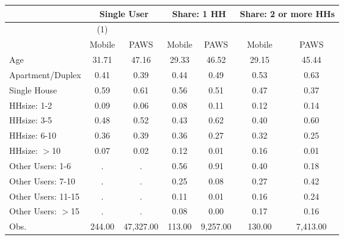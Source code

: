 \begin{tabular}{lcccccc}
&\multicolumn{2}{c}{Single User} & \multicolumn{2}{c}{Share: 1 HH} & \multicolumn{2}{c}{Share: 2 or more HHs} \\
\hline
\hline
                    &\multicolumn{1}{c}{(1)}&            &            &            &            &            \\
                    &      Mobile&        PAWS&      Mobile&        PAWS&      Mobile&        PAWS\\
\hline
Age                 &       31.71&       47.16&       29.33&       46.52&       29.15&       45.44\\
Apartment/Duplex    &        0.41&        0.39&        0.44&        0.49&        0.53&        0.63\\
Single House        &        0.59&        0.61&        0.56&        0.51&        0.47&        0.37\\
HHsize: 1-2         &        0.09&        0.06&        0.08&        0.11&        0.12&        0.14\\
HHsize: 3-5         &        0.48&        0.52&        0.43&        0.62&        0.40&        0.60\\
HHsize: 6-10        &        0.36&        0.39&        0.36&        0.27&        0.32&        0.25\\
HHsize: $>$10       &        0.07&        0.02&        0.12&        0.01&        0.16&        0.01\\
Other Users: 1-6    &           .&           .&        0.56&        0.91&        0.40&        0.18\\
Other Users: 7-10   &           .&           .&        0.25&        0.08&        0.27&        0.42\\
Other Users: 11-15  &           .&           .&        0.11&        0.01&        0.16&        0.24\\
Other Users: $>$15  &           .&           .&        0.08&        0.00&        0.17&        0.16\\
Obs.                &      244.00&   47,327.00&      113.00&    9,257.00&      130.00&    7,413.00\\
\end{tabular}
